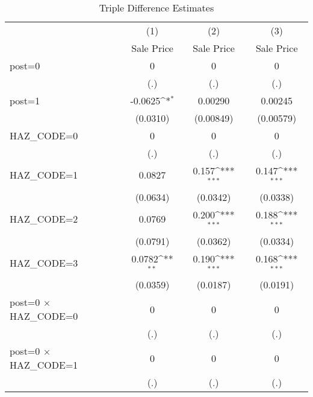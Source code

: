 \begin{table}[htbp]\centering
\def\sym#1{\ifmmode^{#1}\else\(^{#1}\)\fi}
\caption{Triple Difference Estimates\label{tabl}}
\begin{tabular}{l*{3}{c}}
\hline\hline
                    &\multicolumn{1}{c}{(1)}&\multicolumn{1}{c}{(2)}&\multicolumn{1}{c}{(3)}\\
                    &\multicolumn{1}{c}{Sale Price}&\multicolumn{1}{c}{Sale Price}&\multicolumn{1}{c}{Sale Price}\\
\hline
post=0              &           0         &           0         &           0         \\
                    &         (.)         &         (.)         &         (.)         \\
[1em]
post=1              &     -0.0625\sym{*}  &     0.00290         &     0.00245         \\
                    &    (0.0310)         &   (0.00849)         &   (0.00579)         \\
[1em]
HAZ\_CODE=0          &           0         &           0         &           0         \\
                    &         (.)         &         (.)         &         (.)         \\
[1em]
HAZ\_CODE=1          &      0.0827         &       0.157\sym{***}&       0.147\sym{***}\\
                    &    (0.0634)         &    (0.0342)         &    (0.0338)         \\
[1em]
HAZ\_CODE=2          &      0.0769         &       0.200\sym{***}&       0.188\sym{***}\\
                    &    (0.0791)         &    (0.0362)         &    (0.0334)         \\
[1em]
HAZ\_CODE=3          &      0.0782\sym{**} &       0.190\sym{***}&       0.168\sym{***}\\
                    &    (0.0359)         &    (0.0187)         &    (0.0191)         \\
[1em]
post=0 $\times$ HAZ\_CODE=0&           0         &           0         &           0         \\
                    &         (.)         &         (.)         &         (.)         \\
[1em]
post=0 $\times$ HAZ\_CODE=1&           0         &           0         &           0         \\
                    &         (.)         &         (.)         &         (.)         \\

\end{tabular}
\end{table}
